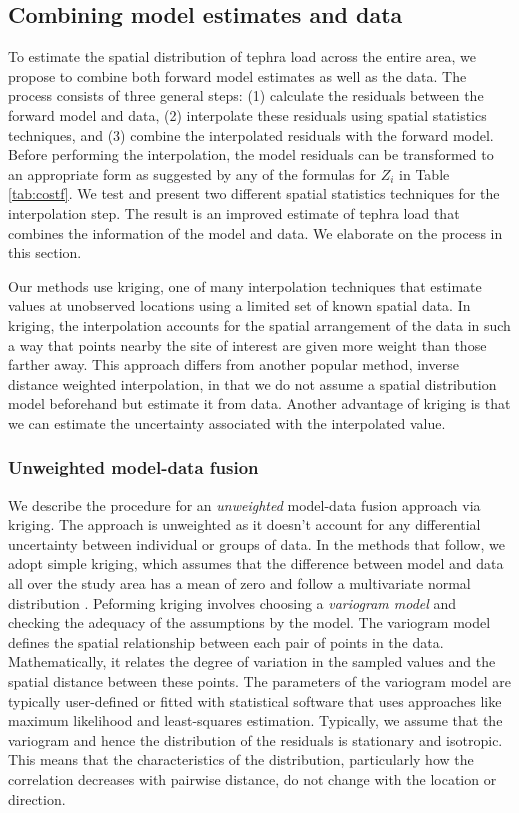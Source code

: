 \documentclass[a4paper,fleqn]{cas-sc}
\begin{document}
\subsection{Combining model estimates and data} 
\label{subsection-kriging}

To estimate the spatial distribution of tephra load across the entire area, we propose to combine both forward model estimates as well as the data. The process consists of three general steps: (1) calculate the residuals between the forward model and data, (2) interpolate these residuals using spatial statistics techniques, and (3) combine the interpolated residuals with the forward model. Before performing the interpolation, the model residuals can be transformed to an appropriate form as suggested by any of the formulas for $Z_{i}$ in Table \ref{tab:costf}. We test and present two different spatial statistics techniques for the interpolation step. The result is an improved estimate of tephra load that combines the information of the model and data. We elaborate on the process in this section. 

Our methods use kriging, one of many interpolation techniques that estimate values at unobserved locations using a limited set of known spatial data. In kriging, the interpolation accounts for the spatial arrangement of the data in such a way that points nearby the site of interest are given more weight than those farther away. This approach differs from another popular method, inverse distance weighted interpolation, in that we do not assume a spatial distribution model beforehand but estimate it from data. Another advantage of kriging is that we can estimate the uncertainty associated with the interpolated value. 

\subsubsection{Unweighted model-data fusion} \label{subsection-kriging-interp}

We describe the procedure for an \textit{unweighted} model-data fusion approach via kriging. The approach is unweighted as it doesn't account for any differential uncertainty between individual or groups of data. In the methods that follow, we adopt simple kriging, which assumes that the difference between model and data all over the study area has a mean of zero and follow a multivariate normal distribution  \citep{Wackernagel2003}. Peforming kriging involves choosing a \textit{variogram model} and checking the adequacy of the assumptions by the model. The variogram model defines the spatial relationship between each pair of points in the data. Mathematically, it relates the degree of variation in the sampled values and the spatial distance between these points. The parameters of the variogram model are typically user-defined or fitted with statistical software that uses approaches like maximum likelihood and least-squares estimation. Typically, we assume that the variogram and hence the distribution of the residuals is stationary and isotropic. This means that the characteristics of the distribution, particularly how the correlation decreases with pairwise distance, do not change with the location or direction.
\end{document}
